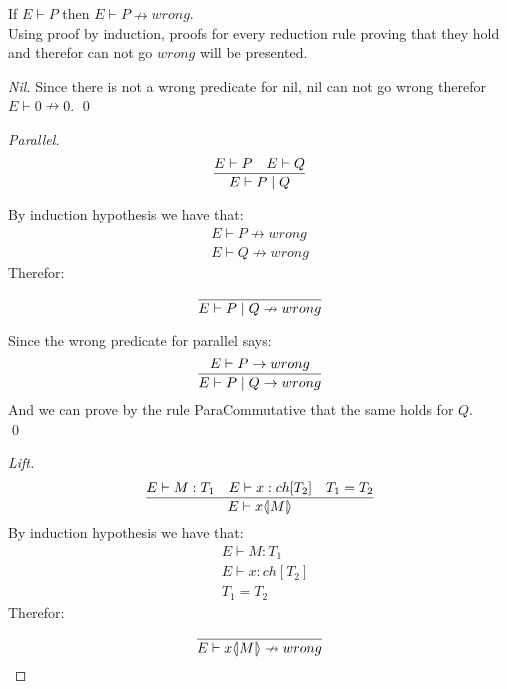 \begin{theorem}
    If \ensuremath{E \vdash P} then \ensuremath{E \vdash P \nrightarrow wrong}.\\
    Using proof by induction, proofs for every reduction rule proving that they hold and therefor can not go \ensuremath{wrong} will be presented.

    \begin{proof}[Nil]
        Since there is not a wrong predicate for nil, nil can not go wrong therefor \ensuremath{E \vdash 0 \nrightarrow 0}.
        \qed
    \end{proof}

    \begin{proof}[Parallel]
        \begin{align*}
            \frac{E \vdash P \quad E \vdash Q }{E \vdash P \mid Q}
        \end{align*}

        By induction hypothesis we have that: 
        \begin{align*}
            E \vdash P \nrightarrow wrong\\
            E \vdash Q \nrightarrow wrong
        \end{align*}
        Therefor:
        \begin{align*}
            \frac{}{E \vdash P \mid Q \nrightarrow wrong}
        \end{align*}

        Since the wrong predicate for parallel says:
        \begin{align*}
            \frac{E \vdash P \rightarrow wrong}{E \vdash P \mid Q \rightarrow wrong}
        \end{align*}
        And we can prove by the rule ParaCommutative that the same holds for \ensuremath{Q}.\\
        \qed
    \end{proof}

    \begin{proof}[Lift]
        \begin{align*}
            \frac{E \vdash M:T_1 \quad E \vdash x:ch[T_2] \quad T_1 = T_2}{E \vdash x \langle \! | M | \! \rangle}
        \end{align*}
        By induction hypothesis we have that:
        \begin{align*}
            &E \vdash M:T_1\\
            &E \vdash x:ch[T_2]\\
            &T_1 = T_2
        \end{align*}
        Therefor:
        \begin{align*}
            \frac{}{E \vdash x \langle \! | M | \! \rangle \nrightarrow wrong}
        \end{align*}


\end{proof}
\end{theorem}
